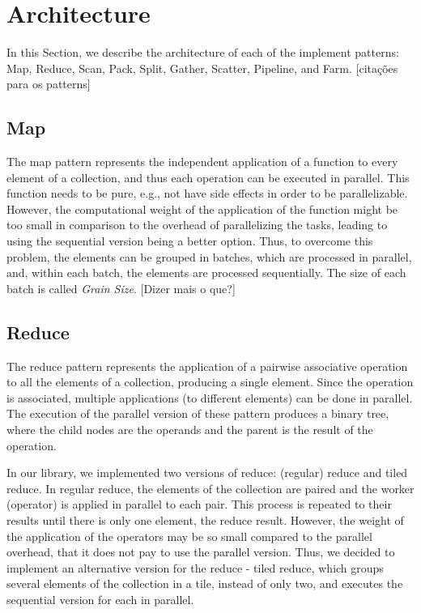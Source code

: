 \documentclass[conference,compsoc]{IEEEtran}
\begin{document}
\section{Architecture} \label{Architecture}

In this Section, we describe the architecture of each of the implement patterns: Map, Reduce, Scan, Pack, Split, Gather, Scatter, Pipeline, and Farm. [citações para os patterns]

\subsection{Map}
The map pattern represents the independent application of a function to every element of a collection, and thus each operation can be executed in parallel. This function needs to be pure, e.g., not have side effects in order to be parallelizable. However, the computational weight of the application of the function might be too small in comparison to the overhead of parallelizing the tasks, leading to using the sequential version being a better option. Thus, to overcome this problem, the elements can be grouped in batches, which are processed in parallel, and, within each batch, the elements are processed sequentially. The size of each batch is called \emph{Grain Size}. [Dizer mais o que?]

\subsection{Reduce}
The reduce pattern represents the application of a pairwise associative operation to all the elements of a collection, producing a single element. Since the operation is associated, multiple applications (to different elements) can be done in parallel. The execution of the parallel version of these pattern produces a binary tree, where the child nodes are the operands and the parent is the result of the operation.

In our library, we implemented two versions of reduce: (regular) reduce and tiled reduce. In regular reduce, the elements of the collection are paired and
the worker (operator) is applied in parallel to each pair. This process is repeated to their results until there is only one element, the reduce result.
However, the weight of the application of the operators may be so small compared to the parallel overhead, that it does not pay to use the parallel version.
Thus, we decided to implement an alternative version for the reduce - tiled reduce, which groups several elements of the collection in a tile, instead of only two, and executes the sequential version for each in parallel.
\end{document}
